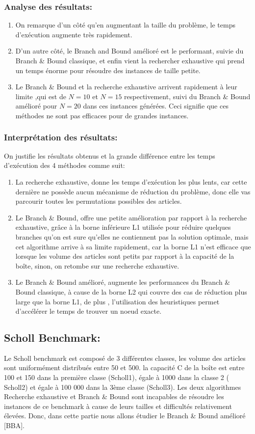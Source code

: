 \documentclass[12pt]{article}
\begin{document}
\subsubsection{Analyse des résultats:}
\begin{enumerate}
    \item On remarque d’un côté qu’en augmentant la taille du problème, le temps d'exécution augmente très rapidement.
    \item D’un autre côté, le Branch and Bound amélioré est le performant, suivie du Branch \& Bound classique, et enfin vient la rechercher exhaustive qui prend un temps énorme pour résoudre des instances de taille petite. 
    \item Le Branch \& Bound et la recherche exhaustive arrivent rapidement à leur limite ,qui est de \(N=10\) et \(N=15\) respectivement, suivi du Branch \& Bound amélioré pour \(N=20\) dans ces instances générées. Ceci signifie que ces méthodes ne sont pas efficaces pour de grandes instances.
\end{enumerate}
\subsubsection{Interprétation des résultats:}
On justifie les résultats obtenus et la grande différence entre les temps d’exécution des 4 méthodes comme suit: 
\begin{enumerate}
    \item La recherche exhaustive, donne les temps d'exécution les plus lents, car cette dernière ne possède aucun mécanisme de réduction du problème, donc elle vas parcourir toutes les permutations possibles des articles.
    \item Le Branch \& Bound, offre une petite amélioration par rapport à la recherche exhaustive, grâce à la borne inférieure L1 utilisée pour réduire quelques branches qu’on est sure qu’elles ne contiennent pas la solution optimale, mais cet algorithme arrive à sa limite rapidement, car la borne L1 n’est efficace que lorsque les volume des articles sont petits par rapport à la capacité de la boîte, sinon, on retombe sur une recherche exhaustive.
    \item Le Branch \& Bound amélioré, augmente les performances du Branch \& Bound classique, à cause de la borne L2 qui couvre des cas de réduction plus large que la borne L1, de plus , l’utilisation des heuristiques permet d'accélérer le temps de trouver un noeud exacte.
\end{enumerate}
\subsection{Scholl Benchmark:}
Le Scholl benchmark est composé de 3 différentes classes, les volume des articles sont uniformément distribués entre 50 et 500. la capacité C de la boîte est entre 100 et 150 dans la première classe (Scholl1), égale à 1000 dans la classe 2 ( Scholl2) et égale à 100 000 dans la 3ème classe (Scholl3). 
Les deux algorithmes Recherche exhaustive et Branch \& Bound sont incapables de résoudre les instances de ce benchmark à cause de leurs tailles et difficultés relativement élevées. Donc, dans cette partie nous allons étudier le Branch \& Bound amélioré [BBA]. 
\end{document}
